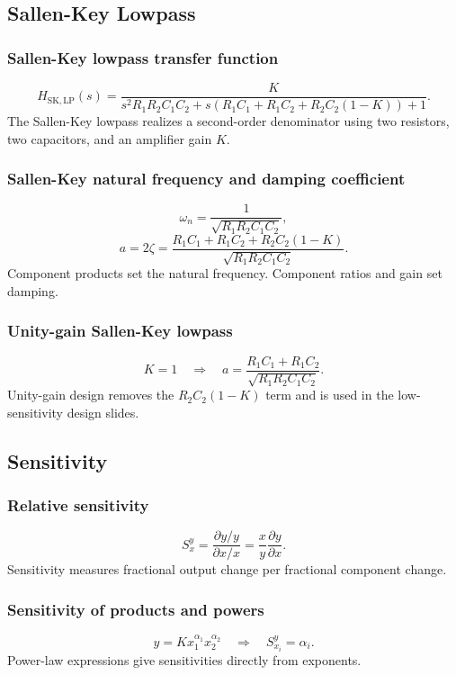 \subsection{Sallen-Key Lowpass}

\subsubsection{Sallen-Key lowpass transfer function}
\[
H_{\mathrm{SK,LP}}(s)=
\frac{K}{s^2R_1R_2C_1C_2+s\left(R_1C_1+R_1C_2+R_2C_2(1-K)\right)+1}.
\]
The Sallen-Key lowpass realizes a second-order denominator using two resistors, two capacitors, and an amplifier gain \(K\).

\subsubsection{Sallen-Key natural frequency and damping coefficient}
\[
\omega_n=\frac{1}{\sqrt{R_1R_2C_1C_2}},
\]
\[
a=2\zeta=\frac{R_1C_1+R_1C_2+R_2C_2(1-K)}{\sqrt{R_1R_2C_1C_2}}.
\]
Component products set the natural frequency. Component ratios and gain set damping.

\subsubsection{Unity-gain Sallen-Key lowpass}
\[
K=1 \quad \Rightarrow \quad
a=\frac{R_1C_1+R_1C_2}{\sqrt{R_1R_2C_1C_2}}.
\]
Unity-gain design removes the \(R_2C_2(1-K)\) term and is used in the low-sensitivity design slides.

\subsection{Sensitivity}

\subsubsection{Relative sensitivity}
\[
S_x^y=\frac{\partial y/y}{\partial x/x}=\frac{x}{y}\frac{\partial y}{\partial x}.
\]
Sensitivity measures fractional output change per fractional component change.

\subsubsection{Sensitivity of products and powers}
\[
y=Kx_1^{\alpha_1}x_2^{\alpha_2}
\quad \Rightarrow \quad
S_{x_i}^{y}=\alpha_i.
\]
Power-law expressions give sensitivities directly from exponents.

